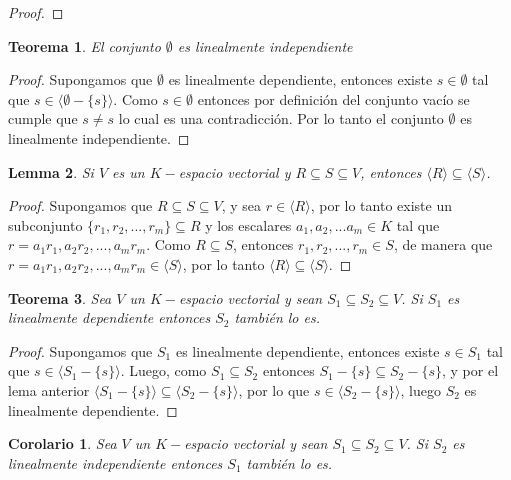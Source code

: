 \documentclass{book}
\newtheorem{theorem}{Teorema}
\newtheorem{corollary}{Corolario}
\newtheorem{lemma}[theorem]{Lemma}
\begin{document}
\begin{proof}

\end{proof}

\begin{theorem}
El conjunto $\emptyset$ es linealmente independiente
\end{theorem}

\begin{proof}
Supongamos que $\emptyset$ es linealmente dependiente, entonces existe $s \in \emptyset$ tal que $s \in \langle \emptyset-\{s\} \rangle$. Como $s \in \emptyset$ entonces por definición del conjunto vacío se cumple que $s\neq s$ lo cual es una contradicción. Por lo tanto el conjunto $\emptyset$ es linealmente independiente.
\end{proof}

\begin{lemma}
Si $V$ es un $K-$espacio vectorial y $R\subseteq S\subseteq V$, entonces $\langle R \rangle \subseteq \langle S \rangle$.
\end{lemma}

\begin{proof}
Supongamos que $R\subseteq S\subseteq V$, y sea $r \in \langle R \rangle$, por lo tanto existe un subconjunto $\{r_1,r_2,...,r_m \} \subseteq R$ y los escalares $a_1,a_2,...a_m \in K$ tal que $r=a_1r_1,a_2r_2,...,a_mr_m$. Como $R\subseteq S$, entonces $r_1,r_2,...,r_m \in S$, de manera que $r=a_1r_1,a_2r_2,...,a_mr_m \in \langle S \rangle$, por lo tanto $\langle R \rangle \subseteq \langle S \rangle$.

\end{proof}

\begin{theorem}
Sea $V$ un $K-$espacio vectorial y sean $S_1\subseteq S_2\subseteq V$. Si $S_1$ es linealmente dependiente entonces $S_2$ también lo es.
\end{theorem}

\begin{proof}
Supongamos que $S_1$ es linealmente dependiente, entonces existe $s \in S_1$ tal que $s \in \langle S_1-\{s\} \rangle$. Luego, como $S_1\subseteq S_2$ entonces $S_1-\{s\} \subseteq S_2-\{s \}$, y por el lema anterior $\langle S_1-\{s \} \rangle \subseteq \langle S_2-\{s \} \rangle$, por lo que $s \in \langle S_2-\{s\} \rangle$, luego $S_2$ es linealmente dependiente.
\end{proof}

\begin{corollary}
Sea $V$ un $K-$espacio vectorial y sean $S_1\subseteq S_2\subseteq V$. Si $S_2$ es linealmente independiente entonces $S_1$ también lo es.
\end{corollary}
\end{document}
